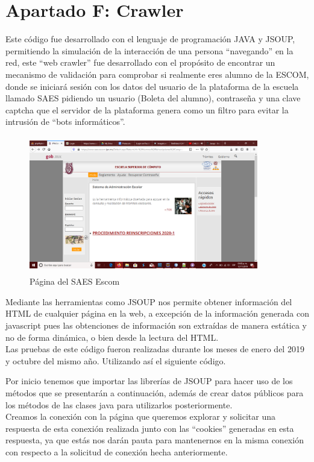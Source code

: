	\chapter{Apartado F: Crawler}
		\label{crawler}
		\noindent Este código fue desarrollado con el lenguaje de programación JAVA y JSOUP, permitiendo la simulación de la interacción de una persona “navegando” en la red, este “web crawler” fue desarrollado con el propósito de encontrar un mecanismo de validación para comprobar si realmente eres alumno de la ESCOM, donde se iniciará sesión con los datos del usuario de la plataforma de la escuela llamado SAES pidiendo un usuario (Boleta del alumno), contraseña y una clave captcha que el servidor de la plataforma genera como un filtro para evitar la intrusión de “bots informáticos”.\\
		
		\begin{figure}[hbt!]
			\centering
			\includegraphics[width=10cm, height=6cm]{Imagenes/Crawler/SAES}
			\caption{Página del SAES Escom}
			\label{saes}
		\end{figure}
	
		\noindent Mediante las herramientas como JSOUP nos permite obtener información del HTML de cualquier página en la web, a excepción de la información generada con javascript pues las obtenciones de información son extraídas de manera estática y no de forma dinámica, o bien desde la lectura del HTML.\\
		\noindent Las pruebas de este código fueron realizadas durante los meses de enero del 2019 y octubre del mismo año. Utilizando así el siguiente código.
\pagebreak
		
		\noindent Por inicio tenemos que importar las librerías de JSOUP para hacer uso de los métodos que se presentarán a continuación, además de crear datos públicos para los métodos de las clases java para utilizarlos posteriormente.\\
		\noindent Creamos la conexión con la página que queremos explorar y solicitar una respuesta de esta conexión realizada junto con las “cookies” generadas en esta respuesta, ya que estás nos darán pauta para mantenernos en la misma conexión con respecto a la solicitud de conexión hecha anteriormente. \\
		
